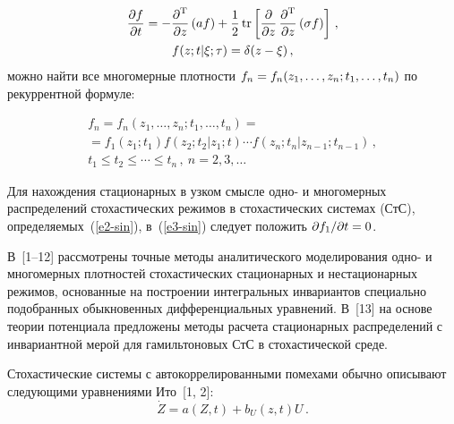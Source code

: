 \begin{multicols}{2}
    
    \noindent
    \begin{multline}
    \displaystyle\frac{\displaystyle \partial f\mathstrut}{\displaystyle \partial t\mathstrut} = -\displaystyle\frac{\displaystyle \partial^{\mathrm{T}}\mathstrut}{\displaystyle \partial z\mathstrut}\left( af\right) 
+\displaystyle\frac{\displaystyle 1\mathstrut}{\displaystyle 2\mathstrut}\,\mathrm{tr}\left[ \displaystyle\frac{\displaystyle \partial\mathstrut}{\displaystyle \partial z\mathstrut}\,\displaystyle\frac{\displaystyle \partial^{\mathrm{T}}\mathstrut}{\displaystyle \partial z\mathstrut}\left( 
\sigma f\right)\right]\,,\\
    f(z;t\vert \xi;\tau)=\delta(z-\xi)\,,
    \label{e3-sin}
    \end{multline}
можно найти все многомерные плот\-ности $f_n\hm= f_n(z_1, \ldots , z_n; 
t_1,\ldots , t_n)$ по рекуррентной фор\-муле:

\vspace*{-3pt}

\noindent
\begin{multline*}
f_n=f_n(z_1,\ldots ,z_n; t_1,\ldots ,t_n) ={}\\
{}=f_1(z_1;t_1)f(z_2;t_2\vert z_1;t)\cdots f(z_n;t_n\vert z_{n-1};t_{n-1})\,,\\
t_1\leq t_2\leq \cdots \leq t_n\,, \ 
n=2,3,\ldots
\end{multline*}


    
    Для нахождения стационарных в узком смысле одно- и многомерных 
распределений стохастических режимов в стохастических сис\-те\-мах (СтС), 
определяемых~(\ref{e2-sin}), в~(\ref{e3-sin}) следует положить $\partial  
f_1/\partial  t\hm=0$. 
    
    В~[1--12] рассмотрены точные методы аналитического моделирования 
одно- и многомерных плот\-но\-стей стохастических стационарных и 
нестационарных режимов, основанные на построении интегральных 
инвариантов специально подобранных обыкновенных дифференциальных 
уравнений. В~[13] на основе теории потенциала предложены методы расчета 
стационарных распределений с инвариантной мерой для гамильтоновых СтС в 
стохастической среде.
    
    Стохастические сис\-те\-мы с автокоррелированными помехами обычно 
описывают следующими уравнениями Ито~[1, 2]:
    \begin{equation}
    \dot{Z}=a(Z,t)+b_U(z,t)U\,.
    \label{e5-sin}
    \end{equation}
    
    

\end{multicols}
